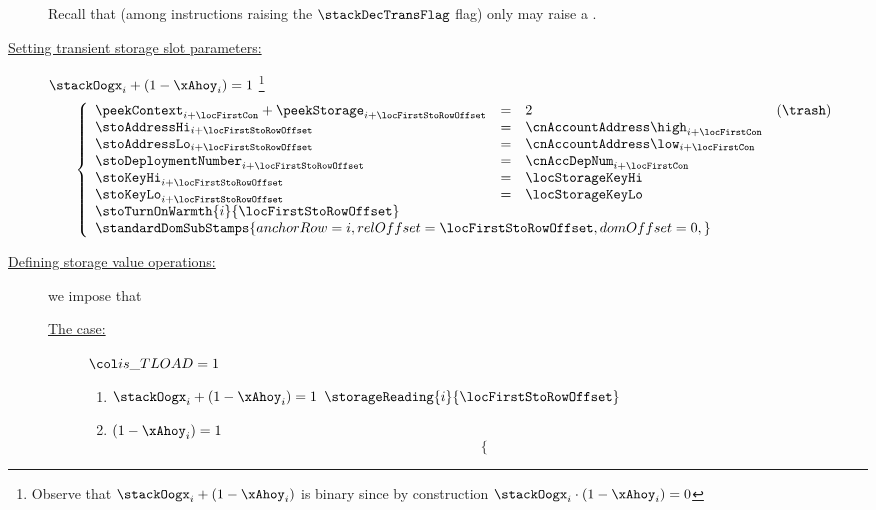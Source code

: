 \begin{description}
		\saNote{}
		Recall that (among instructions raising the $\stackDecTransFlag$ flag) only  may raise a \staticxSH{}.
	\item[\underline{Setting transient storage slot parameters:}]
		\If $\stackOogx_{i} + (1 - \xAhoy_{i}) = 1$ \Then\footnote{Observe that $\stackOogx_{i} + (1 - \xAhoy_{i})$ is binary since by construction $\stackOogx_{i} \cdot (1 - \xAhoy_{i}) = 0$}
		\[
			\left\{ \begin{array}{lclr}
				\peekContext          _{i + \locFirstCon} + \peekStorage_{i + \locFirstStoRowOffset} & = & 2                                            & (\trash) \\
				\stoAddressHi         _{i + \locFirstStoRowOffset}                                   & = & \cnAccountAddress\high  _{i + \locFirstCon} \\
				\stoAddressLo         _{i + \locFirstStoRowOffset}                                   & = & \cnAccountAddress\low   _{i + \locFirstCon} \\
				\stoDeploymentNumber  _{i + \locFirstStoRowOffset}                                   & = & \cnAccDepNum            _{i + \locFirstCon} \\
				\stoKeyHi             _{i + \locFirstStoRowOffset}                                   & = & \locStorageKeyHi                \\
				\stoKeyLo             _{i + \locFirstStoRowOffset}                                   & = & \locStorageKeyLo                \\
				\multicolumn{3}{l}{\stoTurnOnWarmth      {i}{\locFirstStoRowOffset}     } \\
				\multicolumn{3}{l}{
					\standardDomSubStamps {
						anchorRow        = i,
						relOffset        = \locFirstStoRowOffset,
						domOffset        = 0,
					}
				} \\
			\end{array} \right.
		\]
	\item[\underline{Defining storage value operations:}]
		we impose that
		\begin{description}
			\item[\underline{The  case:}]
				\If $\locIsTload = 1$ \Then
				\begin{enumerate}
					\item \If $\stackOogx_{i} + (1 - \xAhoy_{i}) = 1$ \Then $\storageReading{i}{\locFirstStoRowOffset}$
					\item \If $(1 - \xAhoy_{i}) = 1$ \Then
						\[
							\left\{ \begin{array}{lcl}

\end{array}\]
\end{enumerate}
\end{description}
\end{description}
